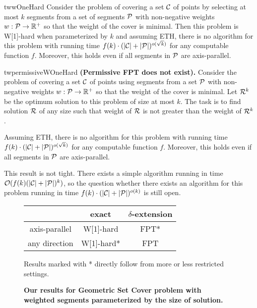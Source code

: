 \begin{restatable}{tw}{wOneHard}
\label{w1_hard}
	Consider the problem of covering a set $\mathcal{C}$ of points
	by selecting at most $k$ segments
	from a set of segments $\mathcal{P}$ 
	with non-negative weights $w : \mathcal{P} \rightarrow \mathbb{R^+}$
	so that the weight of the cover is minimal.
	Then this problem is W[1]-hard when parameterized by $k$ and
	assuming ETH, there is no algorithm for this
	problem with running time
	$f(k)\cdot(|\mathcal{C}| + |\mathcal{P}|)^{o(\sqrt{k})}$
	for any computable function $f$.
	Moreover, this holds even if all segments in $\mathcal{P}$
	are axis-parallel.
\end{restatable}

\begin{restatable}{tw}{permissiveWOneHard}
\label{permissive_w1_hard}
\textbf{(Permissive FPT does not exist).}
	Consider the problem of covering a set $\mathcal{C}$ of points
	using segments from a set $\mathcal{P}$ 
	with non-negative weights $w : \mathcal{P} \rightarrow \mathbb{R^+}$
	so that the weight of the cover is minimal.
	Let $\mathcal{R}^k$ be the
	optimum solution to this problem of size at most $k$.
	The task is to find solution $\mathcal{R}$ of any size
	such that weight of $\mathcal{R}$ is not greater than the weight of $\mathcal{R}^k$.
	
	Assuming ETH, there is no algorithm for this
	problem with running time
	$f(k)\cdot(|\mathcal{C}| + |\mathcal{P}|)^{o(\sqrt{k})}$
	for any computable function $f$.
	Moreover, this holds even if all segments in $\mathcal{P}$
	are axis-parallel.
\end{restatable}

This result is not tight. There exists a simple algorithm 
running in time ${\mathcal{O}(f(k)(|\mathcal{C}| + |\mathcal{P}|)^k)}$,
so the question whether there exists an algorithm
for this problem running in time ${f(k)\cdot(|\mathcal{C}| + |\mathcal{P}|)^{o(k)}}$
is still open.

\begin{figure}[h]
\begin{center}
\begin{tabular}{ | c | c | c | }
\hline
                & exact     & $\delta$-extension \\ 
\hline                
 axis-parallel   & W[1]-hard & FPT* \\  
\hline                
 any direction   & W[1]-hard* & FPT \\
\hline                
\end{tabular}
\caption{\textbf{Our results for Geometric Set Cover problem with weighted segments 
parameterized by the size of solution.}}

Results marked with * directly follow from more or less restricted settings.
\label{tab:weighted_fpt}
\end{center}
\end{figure}



